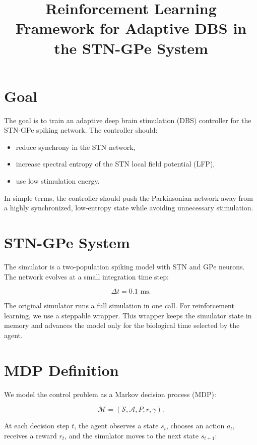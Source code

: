 \documentclass[11pt]{article}
\title{Reinforcement Learning Framework for Adaptive DBS in the STN-GPe System}
\author{}
\date{}
\begin{document}
\maketitle

\section{Goal}

The goal is to train an adaptive deep brain stimulation (DBS) controller for the
STN-GPe spiking network. The controller should:

\begin{itemize}[nosep]
    \item reduce synchrony in the STN network,
    \item increase spectral entropy of the STN local field potential (LFP),
    \item use low stimulation energy.
\end{itemize}

In simple terms, the controller should push the Parkinsonian network away from a
highly synchronized, low-entropy state while avoiding unnecessary stimulation.

\section{STN-GPe System}

The simulator is a two-population spiking model with STN and GPe neurons. The
network evolves at a small integration time step:

\[
\Delta t = 0.1 \text{ ms}.
\]

The original simulator runs a full simulation in one call. For reinforcement
learning, we use a steppable wrapper. This wrapper keeps the simulator state in
memory and advances the model only for the biological time selected by the
agent.

\section{MDP Definition}

We model the control problem as a Markov decision process (MDP):

\[
\mathcal{M} = (\mathcal{S}, \mathcal{A}, P, r, \gamma).
\]

At each decision step \(t\), the agent observes a state \(s_t\), chooses an
action \(a_t\), receives a reward \(r_t\), and the simulator moves to the next
state \(s_{t+1}\):
\end{document}
